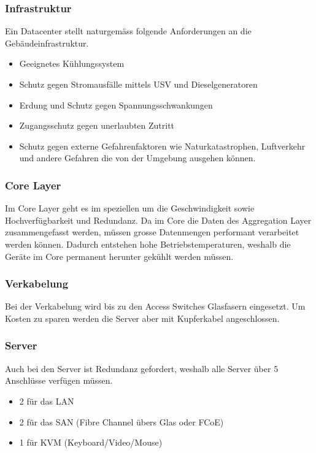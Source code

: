 \subsubsection{Infrastruktur}
Ein Datacenter stellt naturgemäss folgende Anforderungen an die Gebäudeinfrastruktur.
\begin{itemize}
	\item Geeignetes Kühlungssystem
	\item Schutz gegen Stromausfälle mittels USV und Dieselgeneratoren
	\item Erdung und Schutz gegen Spannungsschwankungen
	\item Zugangsschutz gegen unerlaubten Zutritt
	\item Schutz gegen externe Gefahrenfaktoren wie Naturkatastrophen, Luftverkehr und andere Gefahren die von der Umgebung ausgehen können.
\end{itemize}

\subsubsection{Core Layer}
Im Core Layer geht es im speziellen um die Geschwindigkeit sowie Hochverfügbarkeit und Redundanz. Da im Core die Daten des Aggregation Layer zusammengefasst werden, müssen grosse Datenmengen performant verarbeitet werden können. Dadurch entstehen hohe Betriebstemperaturen, weshalb die Geräte im Core permanent herunter gekühlt werden müssen.

\subsubsection{Verkabelung}
Bei der Verkabelung wird bis zu den Access Switches Glasfasern eingesetzt. Um Kosten zu sparen werden die Server aber mit Kupferkabel angeschlossen.

\subsubsection{Server}
Auch bei den Server ist Redundanz gefordert, weshalb alle Server über 5 Anschlüsse verfügen müssen. 
\begin{itemize}
	\item 2 für das LAN 
	\item 2 für das SAN (Fibre Channel übers Glas oder FCoE)
	\item 1 für KVM (Keyboard/Video/Mouse)
\end{itemize}

